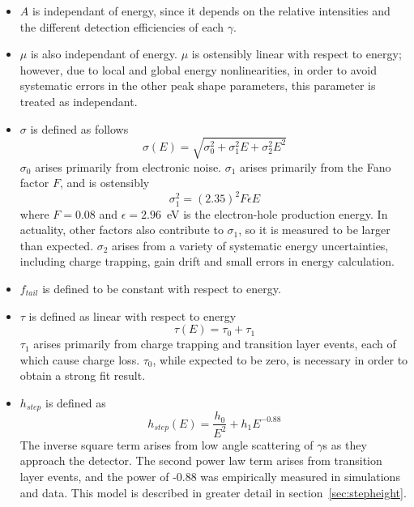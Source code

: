 \documentclass[/main.tex]{subfiles}
\begin{document}
\begin{itemize}
\item $A$ is independant of energy, since it depends on the relative intensities and the different detection efficiencies of each $\gamma$.
\item $\mu$ is also independant of energy.
  $\mu$ is ostensibly linear with respect to energy; however, due to local and global energy nonlinearities, in order to avoid systematic errors in the other peak shape parameters, this parameter is treated as independant.
\item $\sigma$ is defined as follows
  \begin{equation}
    \sigma(E) = \sqrt{\sigma_0^2 + \sigma_1^2E + \sigma_2^2E^2}
  \end{equation}
  $\sigma_0$ arises primarily from electronic noise. $\sigma_1$ arises primarily from the Fano factor $F$, and is ostensibly
  \begin{equation}
    \sigma_1^2 = (2.35)^2F\epsilon E
  \end{equation}
  where $F=0.08$ and $\epsilon=2.96$~eV is the electron-hole production energy.
  In actuality, other factors also contribute to $\sigma_1$, so it is measured to be larger than expected.
  $\sigma_2$ arises from a variety of systematic energy uncertainties, including charge trapping, gain drift and small errors in energy calculation.
\item $f_{tail}$ is defined to be constant with respect to energy.
\item $\tau$ is defined as linear with respect to energy
  \begin{equation}
    \tau(E) = \tau_0 + \tau_1
  \end{equation}
  $\tau_1$ arises primarily from charge trapping and transition layer events, each of which cause charge loss.
  $\tau_0$, while expected to be zero, is necessary in order to obtain a strong fit result.
\item $h_{step}$ is defined as
  \begin{equation}
    h_{step}(E) = \frac{h_0}{E^2} + h_1E^{-0.88}
  \end{equation}
  The inverse square term arises from low angle scattering of $\gamma$s as they approach the detector.
  The second power law term arises from transition layer events, and the power of -0.88 was empirically measured in simulations and data.
  This model is described in greater detail in section~\ref{sec:stepheight}.
\end{itemize}
\end{document}
